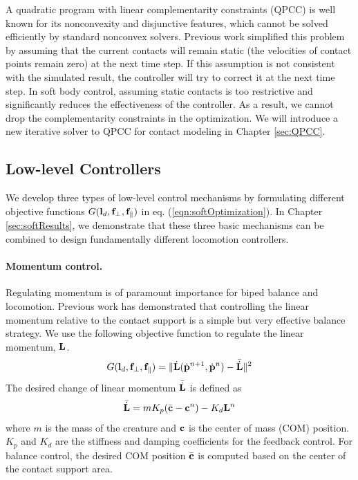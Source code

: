 A quadratic program with linear complementarity constraints (QPCC) is
well known for its nonconvexity and disjunctive features, which cannot
be solved efficiently by standard nonconvex solvers. Previous work
simplified this problem by assuming that the current contacts will
remain static (the velocities of contact points remain zero) at the next time step. If this assumption is not
consistent with the simulated result, the controller will try to
correct it at the next time step. In soft body control, assuming
static contacts is too restrictive and significantly reduces the
effectiveness of the controller. As a result, we cannot drop the
complementarity constraints in the optimization. We will introduce a
new iterative solver to QPCC for contact modeling in Chapter
\ref{sec:QPCC}.

\subsection{Low-level Controllers}
\label{sec:controller}
We develop three types of low-level control mechanisms by formulating different
objective functions $G(\mathbf{l}_d, \mathbf{f}_\perp, \mathbf{f}_\parallel)$ in
eq. (\ref{eqn:softOptimization}). In Chapter \ref{sec:softResults}, we
demonstrate that these three basic mechanisms can be combined to
design fundamentally different locomotion controllers.

\paragraph{Momentum control.}
Regulating momentum is of paramount importance for biped balance and
locomotion. Previous work \cite{Macchietto:2009} has
demonstrated that controlling the linear momentum relative to the
contact support is a simple but very effective balance strategy. We
use the following objective function to regulate the linear momentum, $\mathbf{L}$.
\begin{equation}
G(\mathbf{l}_d, \mathbf{f}_\perp, \mathbf{f}_\parallel) = \| \dot{\mathbf{L}}(\dot{\mathbf{p}}^{n+1}, \dot{\mathbf{p}}^n) - \bar{\dot{\mathbf{L}}} \|^2
\end{equation}
The desired change of linear momentum $\bar{\dot{\mathbf{L}}}$ is defined as
\begin{equation}
\bar{\dot{\mathbf{L}}} = m K_p (\bar{\mathbf{c}} - \mathbf{c}^n) - K_d \mathbf{L}^n
\end{equation}
where $m$ is the mass of the creature and $\mathbf{c}$ is the center of
mass (COM) position. $K_p$ and $K_d$ are the stiffness and damping
coefficients for the feedback control. For balance control, the
desired COM position $\bar{\mathbf{c}}$ is computed based on the center of
the contact support area.

